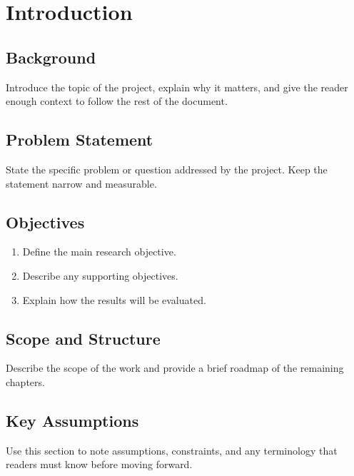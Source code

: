 \chapter{Introduction}

\section{Background}

Introduce the topic of the project, explain why it matters, and give the reader enough context to follow the rest of the document.

\section{Problem Statement}

State the specific problem or question addressed by the project. Keep the statement narrow and measurable.

\section{Objectives}

\begin{enumerate}
    \item Define the main research objective.
    \item Describe any supporting objectives.
    \item Explain how the results will be evaluated.
\end{enumerate}

\section{Scope and Structure}

Describe the scope of the work and provide a brief roadmap of the remaining chapters.

\section{Key Assumptions}

Use this section to note assumptions, constraints, and any terminology that readers must know before moving forward.
